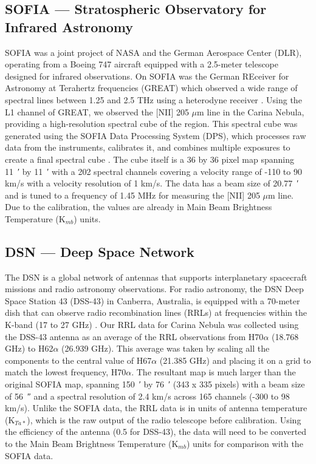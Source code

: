 \subsection{SOFIA --- Stratospheric Observatory for Infrared Astronomy}
SOFIA was a joint project of NASA and the German Aerospace Center (DLR), operating from a Boeing 747 aircraft equipped with a 2.5-meter telescope designed for infrared observations.
On SOFIA was the German REceiver for Astronomy at Terahertz frequencies (GREAT) which observed a wide range of spectral lines between 1.25 and 2.5 THz using a heterodyne receiver \parencite{heyminck2012great}.
Using the L1 channel of GREAT, we observed the [NII] 205 $\mu$m line in the Carina Nebula, providing a high-resolution spectral cube of the region.
This spectral cube was generated using the SOFIA Data Processing System (DPS), which processes raw data from the instruments, calibrates it, and combines multiple exposures to create a final spectral cube \parencite{shuping2014overview}.
The cube itself is a 36 by 36 pixel map spanning \qty{11}{\arcminute} by \qty{11}{\arcminute} with a 202 spectral channels covering a velocity range of -110 to 90 km/s with a velocity resolution of 1 km/s.
The data has a beam size of \qty{20.77}{\arcminute}  and is tuned to a frequency of 1.45 MHz for measuring the [NII] 205 $\mu$m line.
Due to the calibration, the values are already in Main Beam Brightness Temperature (K$_{mb}$) units.

\subsection{DSN --- Deep Space Network}
The DSN is a global network of antennas that supports interplanetary spacecraft missions and radio astronomy observations.
For radio astronomy, the DSN Deep Space Station 43 (DSS-43) in Canberra, Australia, is equipped with a 70-meter dish that can observe radio recombination lines (RRLs) at frequencies within the K-band (17 to 27 GHz) \parencite{virkler2020broadband}.
Our RRL data for Carina Nebula was collected using the DSS-43 antenna as an average of the RRL observations from H70$\alpha$ (18.768 GHz) to H62$\alpha$ (26.939 GHz).
This average was taken by scaling all the components to the central value of H67$\alpha$ (21.385 GHz) and placing it on a grid to match the lowest frequency, H70$\alpha$.
The resultant map is much larger than the original SOFIA map, spanning \qty{150}{\arcminute} by \qty{76}{\arcminute} (343 x 335 pixels) with a beam size of \qty{56}{\arcsecond} and a spectral resolution of 2.4 km/s across 165 channels (-300 to 98 km/s).
Unlike the SOFIA data, the RRL data is in units of antenna temperature (K$_{Ta*}$), which is the raw output of the radio telescope before calibration.
Using the efficiency of the antenna (0.5 for DSS-43), the data will need to be converted to the Main Beam Brightness Temperature (K$_{mb}$) units for comparison with the SOFIA data.

